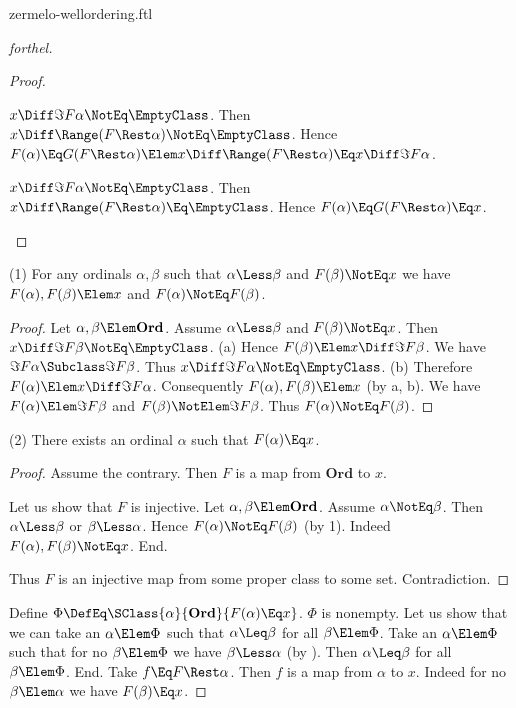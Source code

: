 \documentclass{stex}
\newcommand\Ordinals{\textbf{Ord}}
\begin{document}
\begin{smodule}{zermelo-wellordering.ftl}
\begin{proof}[forthel]
\begin{proof}
    \begin{case}{$x \Diff \Im{F}{\alpha} \NotEq \EmptyClass$.}
      Then $x \Diff \Range(F \Rest \alpha) \NotEq \EmptyClass$.
      Hence $F(\alpha)
        \Eq G(F \Rest \alpha)
        \Elem\linebreak x \Diff \Range(F \Rest \alpha)
        \Eq x \Diff \Im{F}{\alpha}$.
    \end{case}

    \begin{case}{$x \Diff \Im{F}{\alpha} \NotEq \EmptyClass$.}
      Then $x \Diff \Range(F \Rest \alpha) \Eq \EmptyClass$.
      Hence $F(\alpha)
        \Eq G(F \Rest \alpha)
        \Eq\linebreak x$.
    \end{case}
  \end{proof}

  (1) For any ordinals $\alpha, \beta$ such that $\alpha \Less \beta$ and $F(\beta) \NotEq x$ we have $F(\alpha),\linebreak F(\beta) \Elem x$ and $F(\alpha) \NotEq F(\beta)$.
  \begin{proof}
    Let $\alpha, \beta \Elem \Ordinals$.
    Assume $\alpha \Less \beta$ and $F(\beta) \NotEq x$.
    Then $x \Diff \Im{F}{\beta} \NotEq \EmptyClass$.
    (a) Hence $F(\beta) \Elem x \Diff \Im{F}{\beta}$.
    We have $\Im{F}{\alpha} \Subclass \Im{F}{\beta}$.
    Thus $x \Diff \Im{F}{\alpha} \NotEq \EmptyClass$.
    (b) Therefore $F(\alpha) \Elem x \Diff \Im{F}{\alpha}$.
    Consequently $F(\alpha), F(\beta) \Elem x$ (by a, b).
    We have $F(\alpha) \Elem \Im{F}{\beta}$ and $F(\beta) \NotElem \Im{F}{\beta}$.
    Thus $F(\alpha) \NotEq F(\beta)$.
  \end{proof}

  (2) There exists an ordinal $\alpha$ such that $F(\alpha) \Eq x$.
  \begin{proof}
    Assume the contrary.
    Then $F$ is a map from $\Ordinals$ to $x$.

    Let us show that $F$ is injective.
      Let $\alpha, \beta \Elem \Ordinals$.
      Assume $\alpha \NotEq \beta$.
      Then $\alpha \Less \beta$ or $\beta \Less \alpha$.
      Hence $F(\alpha) \NotEq F(\beta)$ (by 1).
      Indeed $F(\alpha), F(\beta) \NotEq x$.
    End.

    Thus $F$ is an injective map from some proper class to some set.
    Contradiction.
  \end{proof}

  Define $\Phi \DefEq \SClass{\alpha}{\Ordinals}{F(\alpha) \Eq x}$.
  $\Phi$ is nonempty.
  Let us show that we can take an $\alpha \Elem \Phi$ such that $\alpha \Leq \beta$ for all $\beta \Elem \Phi$.
    Take an $\alpha \Elem \Phi$ such that for no $\beta \Elem \Phi$ we have $\beta \Less \alpha$ (by ).
    Then $\alpha \Leq \beta$ for all $\beta \Elem \Phi$.
  End.
  Take $f \Eq F \Rest \alpha$.
  Then $f$ is a map from $\alpha$ to $x$.
  Indeed for no $\beta \Elem \alpha$ we have $F(\beta) \Eq x$.


\end{proof}
\end{smodule}
\end{document}
